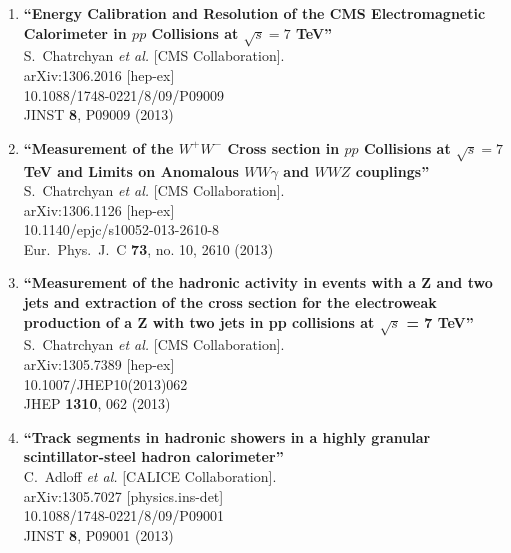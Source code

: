 \documentclass{article}
\begin{document}
\begin{enumerate}
\item%
{\bf ``Energy Calibration and Resolution of the CMS Electromagnetic Calorimeter in $pp$ Collisions at $\sqrt{s} = 7$ TeV''}
  \\{}S.~Chatrchyan {\it et al.}  [CMS Collaboration].
  \\{}arXiv:1306.2016 [hep-ex]
    \\{}10.1088/1748-0221/8/09/P09009
\\{}JINST {\bf 8}, P09009 (2013) %


\item%
{\bf ``Measurement of the $W^+W^-$ Cross section in $pp$ Collisions at $\sqrt{s} = 7$ TeV and Limits on Anomalous $WW\gamma$ and $WWZ$ couplings''}
  \\{}S.~Chatrchyan {\it et al.}  [CMS Collaboration].
  \\{}arXiv:1306.1126 [hep-ex]
    \\{}10.1140/epjc/s10052-013-2610-8
\\{}Eur.\ Phys.\ J.\ C {\bf 73}, no. 10, 2610 (2013) %


\item%
{\bf ``Measurement of the hadronic activity in events with a Z and two jets and extraction of the cross section for the electroweak production of a Z with two jets in pp collisions at $\sqrt{s}$ = 7 TeV''}
  \\{}S.~Chatrchyan {\it et al.}  [CMS Collaboration].
  \\{}arXiv:1305.7389 [hep-ex]
    \\{}10.1007/JHEP10(2013)062
\\{}JHEP {\bf 1310}, 062 (2013) %


\item%
{\bf ``Track segments in hadronic showers in a highly granular scintillator-steel hadron calorimeter''}
  \\{}C.~Adloff {\it et al.}  [CALICE Collaboration].
  \\{}arXiv:1305.7027 [physics.ins-det]
    \\{}10.1088/1748-0221/8/09/P09001
\\{}JINST {\bf 8}, P09001 (2013) %



\end{enumerate}
\end{document}
